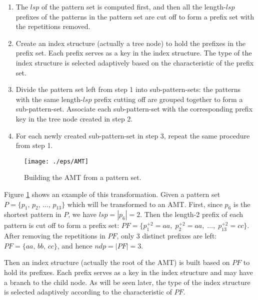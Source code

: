 \documentclass[legalpaper]{article}
\begin{document}
\begin{enumerate}
\item The $lsp$ of the pattern set is computed first, and then all the
length-$lsp$ prefixes of the patterns in the pattern set are cut off
to form a prefix set with the repetitions removed.
\item Create an index structure (actually a tree node) to hold the
prefixes in the prefix set. Each prefix serves as a key in the index
structure. The type of the index structure is selected adaptively
based on the characteristic of the prefix set.
\item Divide the pattern set left from step 1 into sub-pattern-sets:
the patterns with the same length-$lsp$ prefix cutting off are grouped
together to form a sub-pattern-set. Associate each sub-pattern-set with
the corresponding prefix key in the tree node created in step 2.
\item For each newly created sub-pattern-set in step 3, repeat the
same procedure from step 1.
\end{enumerate}

\begin{figure}[htbp]
  \label{fig:AMT}
  \centering
  \texttt{[image: ./eps/AMT]}
  \caption{Building the AMT from a pattern set.}
\end{figure}

Figure \ref{fig:AMT} shows an example of this transformation. Given a
pattern set $P = \{p_1,\, p_2,\, \dots,\, p_{13}\}$ which will be
transformed to an \textsf{AMT}.  First, since $p_6$ is the shortest
pattern in $P$, we have $lsp = |p_6| = 2$. Then the length-2 prefix of
each pattern is cut off to form a prefix set: $PF = \{p_1^{+2} = aa,\;
p_2^{+2} = aa,\; \dots,\; p_{13}^{+2} = cc\}$.  After removing the
repetitions in $PF$, only 3 distinct prefixes are left: $PF = \{aa,\,
bb,\, cc\}$, and hence $ndp = |PF| = 3$.

Then an index structure (actually the root of the \textsf{AMT}) is
built based on $PF$ to hold its prefixes. Each prefix serves as a
\textsf{key} in the index structure and may have a branch to the child
node. As will be seen later, the type of the index structure is
selected adaptively according to the characteristic of $PF$.

\end{document}
